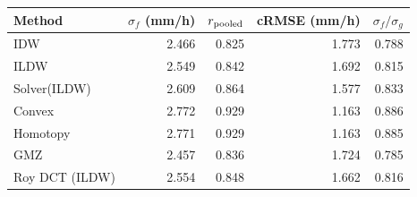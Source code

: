 \begin{tabular}{lrrrr}\toprule
Method & $\sigma_f$ (mm/h) & $r_{\rm pooled}$ & cRMSE (mm/h) & $\sigma_f/\sigma_g$ \\ \midrule
IDW & 2.466 & 0.825 & 1.773 & 0.788 \\
ILDW & 2.549 & 0.842 & 1.692 & 0.815 \\
Solver(ILDW) & 2.609 & 0.864 & 1.577 & 0.833 \\
Convex & 2.772 & 0.929 & 1.163 & 0.886 \\
Homotopy & 2.771 & 0.929 & 1.163 & 0.885 \\
GMZ & 2.457 & 0.836 & 1.724 & 0.785 \\
Roy DCT (ILDW) & 2.554 & 0.848 & 1.662 & 0.816 \\
\bottomrule\end{tabular}
